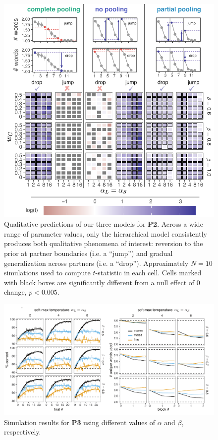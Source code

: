 \documentclass[10pt, jou, floatsintext]{apa7}
\begin{document}
\begin{figure}
\includegraphics[scale=1.2]{./figures/param_grid_qualitative_cleaned.pdf}
\caption{Qualitative predictions of our three models for \textbf{P2}. Across a wide range of parameter values, only the hierarchical model consistently produces both qualitative phenomena of interest: reversion to the prior at partner boundaries (i.e. a ``jump'') and gradual generalization across partners (i.e. a ``drop''). Approximately $N=10$ simulations used to compute $t$-statistic in each cell. Cells marked with black boxes are significantly different from a null effect of 0 change, $p<0.005$.}
\label{fig:generalization_modelcomparison}
\end{figure}


 \begin{figure}
\centering
    \includegraphics[scale=.7]{partitionPrior.pdf}
  \caption{Simulation results for \textbf{P3} using different values of $\alpha$ and $\beta$, respectively.}
  \label{fig:partitionPrior}
\end{figure}
\end{document}

